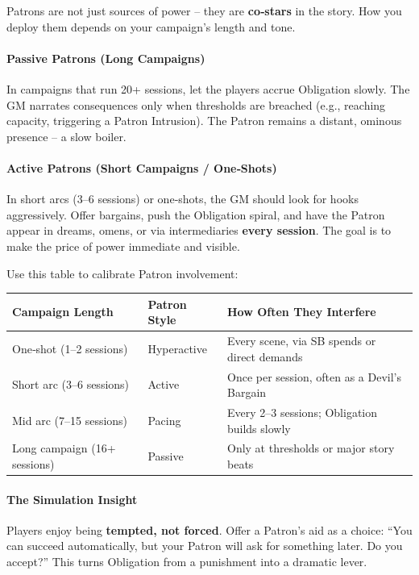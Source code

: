 Patrons are not just sources of power – they are \textbf{co‑stars} in the story. How you deploy them depends on your campaign’s length and tone.

\paragraph{Passive Patrons (Long Campaigns)}
In campaigns that run 20+ sessions, let the players accrue Obligation slowly. The GM narrates consequences only when thresholds are breached (e.g., reaching capacity, triggering a Patron Intrusion). The Patron remains a distant, ominous presence – a slow boiler.

\paragraph{Active Patrons (Short Campaigns / One‑Shots)}
In short arcs (3–6 sessions) or one‑shots, the GM should look for hooks aggressively. Offer bargains, push the Obligation spiral, and have the Patron appear in dreams, omens, or via intermediaries \textbf{every session}. The goal is to make the price of power immediate and visible.

Use this table to calibrate Patron involvement:

\begin{center}
\begin{tabular}{lll}
\toprule
\textbf{Campaign Length} & \textbf{Patron Style} & \textbf{How Often They Interfere} \\
\midrule
One‑shot (1–2 sessions) & Hyperactive & Every scene, via SB spends or direct demands \\
Short arc (3–6 sessions) & Active & Once per session, often as a Devil’s Bargain \\
Mid arc (7–15 sessions) & Pacing & Every 2–3 sessions; Obligation builds slowly \\
Long campaign (16+ sessions) & Passive & Only at thresholds or major story beats \\
\bottomrule
\end{tabular}
\end{center}

\paragraph{The Simulation Insight}
Players enjoy being \textbf{tempted, not forced}. Offer a Patron’s aid as a choice: “You can succeed automatically, but your Patron will ask for something later. Do you accept?” This turns Obligation from a punishment into a dramatic lever.

